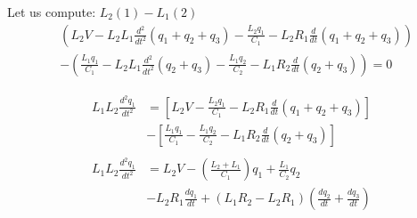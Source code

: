 \documentclass[12pt]{article}
\begin{document}
Let us compute: $L_2(1)-L_1(2)$
\begin{align*}
	&\left( L_2 V-L_2 L_1 \frac{d^2}{dt^2}(q_1+q_2+q_3)-\frac{L_2 q_1}{C_1}-L_2 R_1\frac{d}{dt}(q_1+q_2+q_3)\right)\\ 
	&-\left( \frac{L_1 q_1}{C_1} -L_2 L_1 \frac{d^2}{dt^2}(q_2+q_3)-\frac{L_1 q_2}{C_2} -L_1 R_2 \frac{d}{dt}(q_2+q_3)\right)=0
\end{align*}

\begin{align*}
	L_1 L_2 \frac{d^2 q_1}{dt^2}&=\left[ L_2 V -\frac{L_2 q_1}{C_1}-L_2 R_1 \frac{d}{dt}(q_1+q_2+q_3)\right]\\
	&-\left[\frac{L_1 q_1}{C_1}-\frac{L_1 q_2}{C_2}-L_1 R_2 \frac{d}{dt}(q_2+q_3)\right]\\
	\\    
	L_1 L_2 \frac{d^2 q_1}{dt^2}&=L_2 V -\left(\frac{L_2+L_1}{C_1}\right)q_1+\frac{L_1}{C_2}q_2\\
	&-L_2 R_1\frac{dq_1}{dt}+(L_1 R_2-L_2 R_1)\left(\frac{dq_2}{dt}+\frac{dq_3}{dt}\right)
\end{align*}
\end{document}
